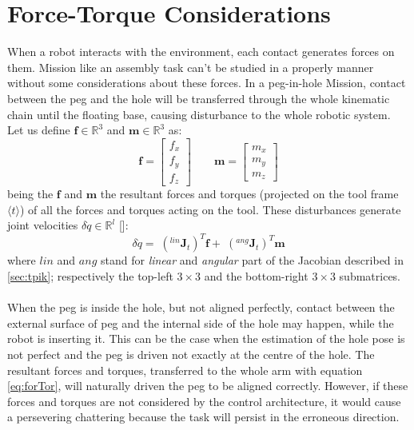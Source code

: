 \section{Force-Torque Considerations}
\label{sec:forceConsideration}
When a robot interacts with the environment, each contact generates forces on them. Mission like an assembly task can't be studied in a properly manner without some considerations about these forces. In a peg-in-hole Mission, contact between the peg and the hole will be transferred through the whole kinematic chain until the floating base, causing disturbance to the whole robotic system.\\
Let us define $\boldsymbol{f} \in \mathbb{R}^3$ and $\boldsymbol{m} \in \mathbb{R}^3$ as:
\begin{equation}
	\boldsymbol{f} = \begin{bmatrix}f_x \\ f_y \\ f_z\end{bmatrix} \qquad
	\boldsymbol{m} = \begin{bmatrix}m_x \\ m_y \\ m_z\end{bmatrix}
\end{equation}
being the $\boldsymbol{f}$ and $\boldsymbol{m}$ the resultant forces and torques (projected on the tool frame $ \langle t \rangle $) of all the forces and torques acting on the tool. These disturbances generate joint velocities $ \delta \dot{q} \in \mathbb{R}^l$ [\cite{bookSiciliano}]:
\begin{equation}
\label{eq:forTor}
	\delta \dot{q} = \;(^{lin}\boldsymbol{J}_t)^T \boldsymbol{f} + \;(^{ang}\boldsymbol{J}_t)^T \boldsymbol{m}
\end{equation}
where $lin$ and $ang$ stand for \textit{linear} and \textit{angular} part of the Jacobian described in \ref{sec:tpik}; respectively the top-left $3\times 3$ and the bottom-right $3\times 3$ submatrices.\\
\vspace*{50px}\\
When the peg is inside the hole, but not aligned perfectly, contact between the external surface of peg and the internal side of the hole may happen, while the robot is inserting it. This can be the case when the estimation of the hole pose is not perfect and the peg is driven not exactly at the centre of the hole.
The resultant forces and torques, transferred to the whole arm with equation \eqref{eq:forTor}, will naturally driven the peg to be aligned correctly. However, if these forces and torques are not considered by the control architecture, it would cause a persevering chattering because the task will persist in the erroneous direction.\\ %
